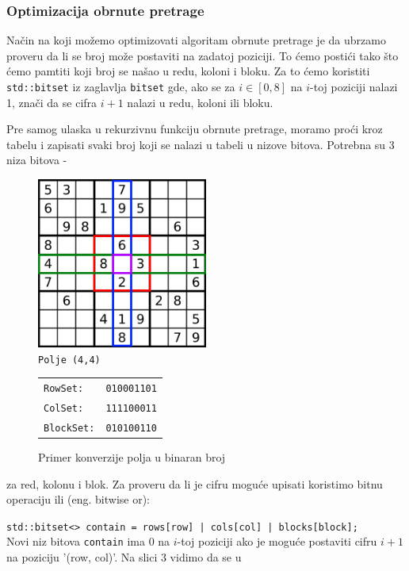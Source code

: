 \documentclass[a4paper]{article}
\begin{document}
    \subsubsection{Optimizacija obrnute pretrage}
    Način na koji možemo optimizovati algoritam obrnute pretrage je da ubrzamo proveru da li se broj može postaviti na zadatoj poziciji. To ćemo postići tako što ćemo pamtiti
    koji broj se našao u redu, koloni i bloku. Za to ćemo koristiti \texttt{std::bitset} iz zaglavlja \texttt{bitset} gde, ako se za $i \in [0,8]$ na $i$-toj poziciji nalazi 1, znači da se cifra $i+1$ nalazi u redu, koloni ili bloku.
    \par Pre samog ulaska u rekurzivnu funkciju obrnute pretrage, moramo proći kroz tabelu i zapisati svaki broj koji se nalazi u tabeli u nizove bitova. Potrebna su 3 niza bitova - 
    \begin{figure}[h]
        \centering
        \includegraphics[width=0.5\textwidth, height=0.5\textwidth]{img/conversion.png}\\
        \texttt{Polje (4,4)}\\
        \begin{tabular}{ l r }
            \texttt{RowSet: } & \texttt{010001101}\\
            \texttt{ColSet: } & \texttt{111100011}\\
            \texttt{BlockSet:}& \texttt{010100110}\\
        \end{tabular}
        \caption{Primer konverzije polja u binaran broj}
    \end{figure}
    za red, kolonu i blok. Za proveru da li je cifru moguće upisati
    koristimo bitnu operaciju ili (eng. bitwise or): 
    \par\texttt{std::bitset<> contain = rows[row] | cols[col] | blocks[block];}\\
    Novi niz bitova \texttt{contain} ima $0$ na $i$-toj poziciji ako je moguće postaviti cifru $i+1$ na poziciju '(row, col)'. Na slici 3 vidimo da se u 
\end{document}

